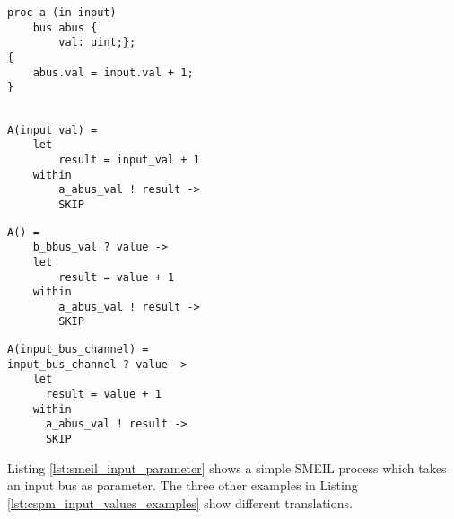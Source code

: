 \begin{minipage}[t]{.98\linewidth}
    \centering
\begin{minipage}[t]{0.45\linewidth}
  \begin{verbatim}
proc a (in input)
    bus abus {
        val: uint;};
{
    abus.val = input.val + 1;
}
  \end{verbatim}
  \label{lst:smeil_input_parameter}
\end{minipage}
\hspace{0.6cm}
\begin{minipage}[t]{0.45\linewidth}
\begin{verbatim}

A(input_val) =
    let
        result = input_val + 1
    within
        a_abus_val ! result ->
        SKIP
\end{verbatim}
\label{lst:cspm_input_value}
\end{minipage}
\hspace{0.6cm}
\vspace{0.5cm}
\newline
\begin{minipage}[t]{0.45\linewidth}
\begin{verbatim}
A() =
    b_bbus_val ? value ->
    let
        result = value + 1
    within
        a_abus_val ! result ->
        SKIP
\end{verbatim}
\label{lst:cspm_no_input}
\end{minipage}
\hspace{0.6cm}
\begin{minipage}[t]{0.45\linewidth}
\begin{verbatim}
A(input_bus_channel) =
input_bus_channel ? value ->
    let
      result = value + 1
    within
      a_abus_val ! result ->
      SKIP
\end{verbatim}
\label{lst:cspm_channel_reads_input}
\end{minipage}
\vspace{0.3cm}
\label{lst:cspm_input_values_examples}
\vspace{1cm}
\end{minipage}
Listing \ref{lst:smeil_input_parameter} shows a simple SMEIL process which takes an input bus as parameter. The three other examples in Listing \ref{lst:cspm_input_values_examples} show different translations.\\

